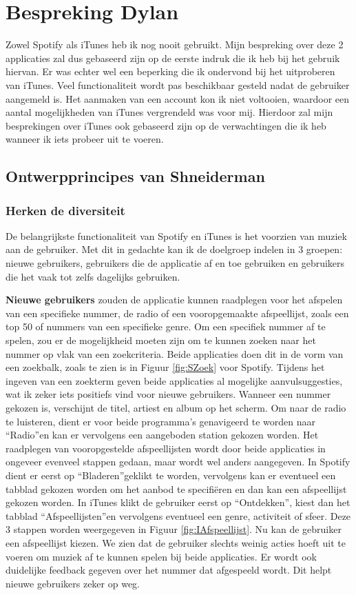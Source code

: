 \documentclass[11pt]{article}
\begin{document}
\section{Bespreking Dylan}
Zowel Spotify als iTunes heb ik nog nooit gebruikt. Mijn bespreking over deze 2 applicaties zal dus gebaseerd zijn op de eerste indruk die ik heb bij het gebruik hiervan. Er was echter wel een beperking die ik ondervond bij het uitproberen van iTunes. Veel functionaliteit wordt pas beschikbaar gesteld nadat de gebruiker aangemeld is. Het aanmaken van een account kon ik niet voltooien, waardoor een aantal mogelijkheden van iTunes vergrendeld was voor mij. Hierdoor zal mijn besprekingen over iTunes ook gebaseerd zijn op de verwachtingen die ik heb wanneer ik iets probeer uit te voeren.
\subsection{Ontwerpprincipes van Shneiderman}
\subsubsection{Herken de diversiteit}
De belangrijkste functionaliteit van Spotify en iTunes is het voorzien van muziek aan de gebruiker. Met dit in gedachte kan ik de doelgroep indelen in 3 groepen: nieuwe gebruikers, gebruikers die de applicatie af en toe gebruiken en gebruikers die het vaak tot zelfs dagelijks gebruiken. 

\textbf{Nieuwe gebruikers} zouden de applicatie kunnen raadplegen voor het afspelen van een specifieke nummer, de radio of een vooropgemaakte afspeellijst, zoals een top 50 of nummers van een specifieke genre. Om een specifiek nummer af te spelen, zou er de mogelijkheid moeten zijn om te kunnen zoeken naar het nummer op vlak van een zoekcriteria. Beide applicaties doen dit in de vorm van een zoekbalk, zoals te zien is in Figuur \ref{fig:SZoek} voor Spotify. Tijdens het ingeven van een zoekterm geven beide applicaties al mogelijke aanvulsuggesties, wat ik zeker iets positiefs vind voor nieuwe gebruikers. Wanneer een nummer gekozen is, verschijnt de titel, artiest en album op het scherm. Om naar de radio te luisteren, dient er voor beide programma's genavigeerd te worden naar \textquotedblleft Radio\textquotedblright en kan er vervolgens een aangeboden station gekozen worden. Het raadplegen van vooropgestelde afspeellijsten wordt door beide applicaties in ongeveer evenveel stappen gedaan, maar wordt wel anders aangegeven. In Spotify dient er eerst op \textquotedblleft Bladeren\textquotedblright geklikt te worden, vervolgens kan er eventueel een tabblad gekozen worden om het aanbod te specifi\"{e}ren en dan kan een afspeellijst gekozen worden. In iTunes klikt de gebruiker eerst op \textquotedblleft Ontdekken\textquotedblright, kiest dan het tabblad \textquotedblleft Afspeellijsten\textquotedblright en vervolgens eventueel een genre, activiteit of sfeer. Deze 3 stappen worden weergegeven in Figuur \ref{fig:IAfspeellijst}. Nu kan de gebruiker een afspeellijst kiezen. We zien dat de gebruiker slechts weinig acties hoeft uit te voeren om muziek af te kunnen spelen bij beide applicaties. Er wordt ook duidelijke feedback gegeven over het nummer dat afgespeeld wordt. Dit helpt nieuwe gebruikers zeker op weg.
\end{document}
